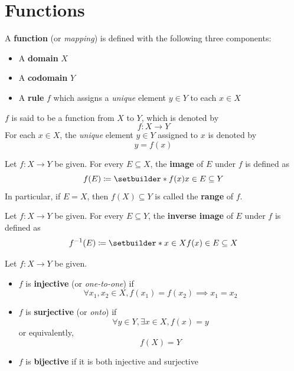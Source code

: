 \section{Functions} \label{an:sec:functions}

A \textbf{function} (or \emph{mapping}) is defined with the following three components:
\begin{itemize}
    \item A \textbf{domain} $X$
    \item A \textbf{codomain} $Y$
    \item A \textbf{rule} $f$ which assigns a \emph{unique} element $y \in Y$ to each $x \in X$
\end{itemize}
$f$ is said to be a function from $X$ to $Y$, which is denoted by
\[
f: X \to Y
\]
For each $x \in X$, the \emph{unique} element $y \in Y$ assigned to $x$ is denoted by
\[
y = f(x)
\]

\bigskip

\begin{definition} \label{an:def:image}
    Let $f: X \to Y$ be given. For every $E \subseteq X$, the \textbf{image} of $E$ under $f$ is defined as
    \[
    f(E) \coloneqq \setbuilder*{f(x)}{x \in E} \subseteq Y
    \]
    In particular, if $E = X$, then $f(X) \subseteq Y$ is called the \textbf{range} of $f$.
\end{definition}

\bigskip

\begin{definition} \label{an:def:inverse-image}
    Let $f: X \to Y$ be given. For every $E \subseteq Y$, the \textbf{inverse image} of $E$ under $f$ is defined as
    \[
    f^{-1}(E) \coloneqq \setbuilder*{x \in X}{f(x) \in E} \subseteq X
    \]
\end{definition}

\bigskip

\begin{definition} \label{an:def:injective-surjective-bijective}
    Let $f: X \to Y$ be given.
    \begin{itemize}
        \item $f$ is \textbf{injective} (or \emph{one-to-one}) if
        \[
        \forall x_{1}, x_{2} \in X, f(x_{1}) = f(x_{2}) \implies x_1 = x_2
        \]
        \item $f$ is \textbf{surjective} (or \emph{onto}) if
        \[
        \forall y \in Y, \exists x \in X, f(x) = y
        \]
        or equivalently,
        \[
        f(X) = Y
        \]
        \item $f$ is \textbf{bijective} if it is both injective and surjective
    \end{itemize}
\end{definition}

